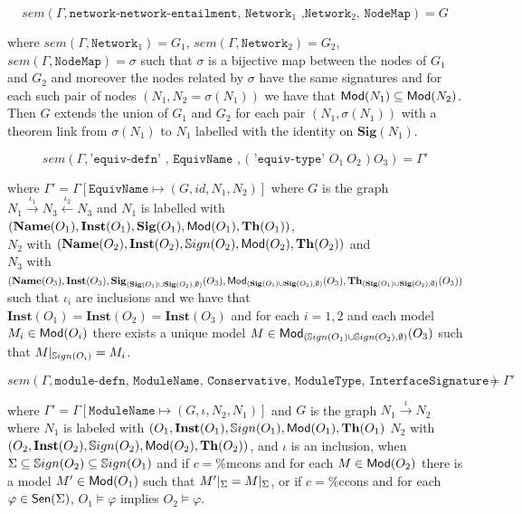 \documentclass[10pt,fleqn,%
\ifpretendfinal
final%
\else
draft%
\fi,
]{scrreprt}
\newcommand*{\syntax}[1]{\texttt{#1}}
\newcommand{\Sig}{\mathbf{Sig}}
\newcommand{\Inst}{\ensuremath{\mathbf{Inst}}}
\newcommand{\Name}{\ensuremath{\mathbf{Name}}}
\newcommand{\semdom}[1]{
\begin{center}
\fbox{$#1$}
\end{center}
}
\begin{document}
$$sem(\Gamma,\syntax{network-network-entailment, Network$_1$ ,Network$_2$, NodeMap}) = G$$

\noindent where $sem(\Gamma, \syntax{Network}_1) = G_1$,
$sem(\Gamma, \syntax{Network}_2) = G_2$, 
$sem(\Gamma, \syntax{NodeMap}) = \sigma$ 
such that $\sigma$ is a bijective map
between the nodes
of $G_1$ and $G_2$ and moreover the nodes related by 
$\sigma$ have the same signatures and
for each such pair of nodes $(N_1, N_2 = \sigma(N_1))$
 we have that $\mathsf{Mod}(N_1)\subseteq \mathsf{Mod}(N_2)$.
Then $G$ extends the union of $G_1$ and $G_2$ for each 
pair $(N_1, \sigma(N_1))$ with a theorem link 
from $\sigma(N_1)$ to $N_1$ labelled with the identity
on $\Sig(N_1)$. 



\semdom{sem(\Gamma,\syntax{EquivDefn})=\Gamma'}

$$sem(\Gamma,\syntax{'equiv-defn' , EquivName , ( 'equiv-type' }O_1\ O_2\syntax{ )}\ O_3)=\Gamma'$$

\noindent where 
$\Gamma' = \Gamma[\syntax{EquivName} \mapsto (G, id, N_1, N_2)]$
where 
$G$ is the graph
$N_1 \stackrel{\iota_1}{\rightarrow} N_3 \stackrel{\iota_2}{\leftarrow} 
N_3$ and
$N_1$ is labelled with $(\Name(O_1), \Inst(O_1), \Sig(O_1),\Mod(O_1), \Th(O_1))$,\\
$N_2$ with $(\Name(O_2), \Inst(O_2),\Sign(O_2), \Mod(O_2), \Th(O_2))$
and \\
$N_3$ with $(\Name(O_3), \Inst(O_3), \Sig_{(\Sig(O_1)\cup\Sig(O_2),\emptyset)}(O_3), \Mod_{(\Sig(O_1)\cup\Sig(O_2),\emptyset)}(O_3),\allowbreak  \Th_{(\Sig(O_1)\cup\Sig(O_2),\emptyset)}(O_3))$\\
such that
$\iota_i$ are inclusions and we have that 
$\Inst(O_1) = \Inst(O_2) = \Inst(O_3)$ and 
for each $i = 1,2$ and each model $M_i \in \mathsf{Mod}(O_i)$ there exists a unique model $M\in \mathsf{Mod}_{(\mathbb{S}ign(O_1)\cup\mathbb{S}ign(O_2),\emptyset)}(O_3)$
such that $M|_{\mathbb{S}ign(O_i)} = M_i$. 

\semdom{sem(\Gamma,  \syntax{ModuleRelDefn}) = \Gamma'}


$$sem(\Gamma, \syntax{module-defn, ModuleName, Conservative, ModuleType, InterfaceSignature}) = \Gamma'$$

\noindent where 
$\Gamma' = \Gamma[\syntax{ModuleName}\mapsto (G,\iota, N_2,N_1)]$
and $G$ is the graph 
$N_1 \stackrel{\iota}{\rightarrow} N_2$
where $N_1$ is labeled with $(O_1, \Inst(O_1),\Sign(O_1), \Mod(O_1), \Th(O_1)$
$N_2$ with 
 $(O_2, \Inst(O_2),\Sign(O_2),  \Mod(O_2), \Th(O_2))$, 
and $\iota$ is an inclusion, 
when $\Sigma \subseteq \mathbb{S}ign(O_2) \subseteq \mathbb{S}ign(O_1)$
and if $c=$\%mcons and for each $M\in\mathsf{Mod}(O_2)$ there is a model $M'\in \mathsf{Mod}(O_1)$ such that
$M'|_{\Sigma} = M|_{\Sigma}$,
or if $c=$\%ccons and for each $\varphi\in\mathsf{Sen}(\Sigma)$, $O_1\models\varphi$
implies $O_2\models\varphi$.
\end{document}
